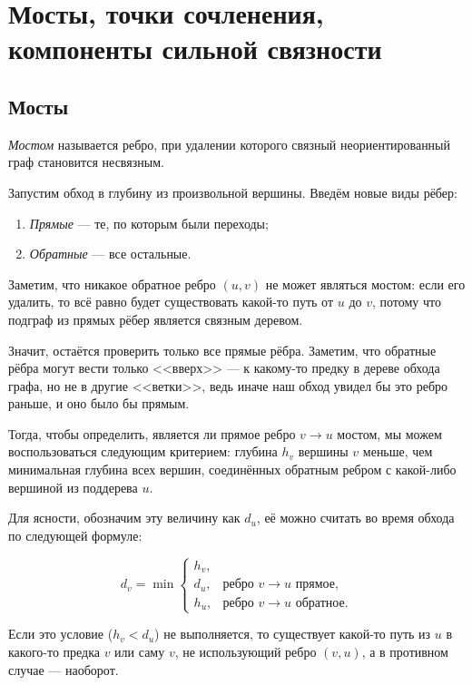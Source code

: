 \section{Мосты, точки сочленения, компоненты сильной связности}

\subsection{Мосты}

\begin{definition}
    \textit{Мостом} называется ребро, при удалении которого связный неориентированный граф становится несвязным.
\end{definition}

Запустим обход в глубину из произвольной вершины. Введём новые виды рёбер:
\begin{enumerate}[nolistsep]
    \item \textit{Прямые} --- те, по которым были переходы;
    \item \textit{Обратные} --- все остальные.
\end{enumerate}

Заметим, что никакое обратное ребро $(u, v)$ не может являться мостом: если его удалить, то всё равно будет существовать какой-то путь от $u$ до $v$, потому что подграф из прямых рёбер является связным деревом.

Значит, остаётся проверить только все прямые рёбра. Заметим, что обратные рёбра могут вести только <<вверх>> --- к какому-то предку в дереве обхода графа, но не в другие <<ветки>>, ведь иначе наш обход увидел бы это ребро раньше, и оно было бы прямым.

Тогда, чтобы определить, является ли прямое ребро $v \to u$ мостом, мы можем воспользоваться следующим критерием: глубина $h_v$ вершины $v$ меньше, чем минимальная глубина всех вершин, соединённых обратным ребром с какой-либо вершиной из поддерева $u$.

Для ясности, обозначим эту величину как $d_u$, её можно считать во время обхода по следующей формуле:

\[
    d_v = \min
    \begin{cases}
        h_v,&\\
        d_u,&\text{ребро $v \to u$ прямое},\\
        h_u,&\text{ребро $v \to u$ обратное}.
    \end{cases}
\]

Если это условие ($h_v < d_u$) не выполняется, то существует какой-то путь из $u$ в какого-то предка $v$ или саму $v$, не использующий ребро $(v, u)$, а в противном случае --- наоборот.

